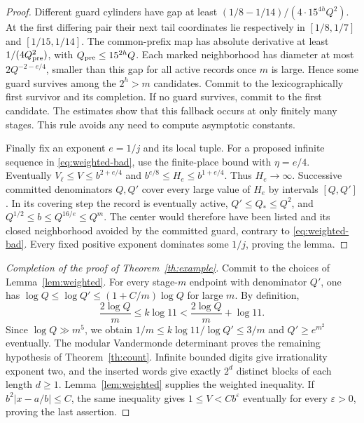 \documentclass[11pt,a4paper]{article}
\begin{document}
\begin{proof}
Different guard cylinders have gap at least
$(1/8-1/14)/(4\cdot15^{4h}Q^2)$. At the first differing pair their
next tail coordinates lie respectively in $[1/8,1/7]$ and
$[1/15,1/14]$. The common-prefix map has absolute derivative at least
$1/(4Q_{\rm pre}^2)$, with $Q_{\rm pre}\le 15^{2h}Q$.
Each marked neighborhood has diameter at most
$2Q^{-2-e/4}$, smaller than this gap for all active records once
$m$ is large. Hence some guard survives among the $2^h>m$ candidates.
Commit to the lexicographically first survivor and its completion.
If no guard survives, commit to the first candidate.
The estimates show that this fallback occurs at only finitely many
stages. This rule avoids any need to compute asymptotic constants.

Finally fix an exponent $e=1/j$ and its local tuple. For a proposed
infinite sequence in \eqref{eq:weighted-bad}, use the finite-place
bound with $\eta=e/4$. Eventually $V_\ell\le V\le b^{2+e/4}$ and
$b^{e/8}\le H_e\le b^{1+e/4}$. Thus $H_e\to\infty$. Successive
committed denominators $Q,Q'$ cover every large value of $H_e$ by
intervals $[Q,Q']$. In its covering step the record is eventually
active, $Q'\le Q_*\le Q^2$, and
$Q^{1/2}\le b\le Q^{16/e}\le Q^m$. The center would therefore have
been listed and its closed neighborhood avoided by the committed
guard, contrary to \eqref{eq:weighted-bad}. Every fixed positive
exponent dominates some $1/j$, proving the lemma.
\end{proof}
\begin{proof}[Completion of the proof of Theorem~\ref{th:example}]
Commit to the choices of Lemma~\ref{lem:weighted}. For every stage-\(m\) endpoint with denominator \(Q'\), one has \(\log Q\le\log Q'\le(1+C/m)\log Q\) for large \(m\). By definition,
\[
 \frac{2\log Q}{m}\le k\log 11<\frac{2\log Q}{m}+\log 11 .
\]
Since \(\log Q\gg m^5\), we obtain \(1/m\le k\log11/\log Q'\le 3/m\) and \(Q'\ge e^{m^2}\) eventually. The modular Vandermonde determinant proves the remaining hypothesis of Theorem~\ref{th:count}. Infinite bounded digits give irrationality exponent two, and the inserted words give exactly \(2^d\) distinct blocks of each length \(d\ge1\). Lemma~\ref{lem:weighted} supplies the weighted inequality. If \(b^2|x-a/b|\le C\), the same inequality gives \(1\le V<C b^\varepsilon\) eventually for every \(\varepsilon>0\), proving the last assertion.
\end{proof}
\end{document}
